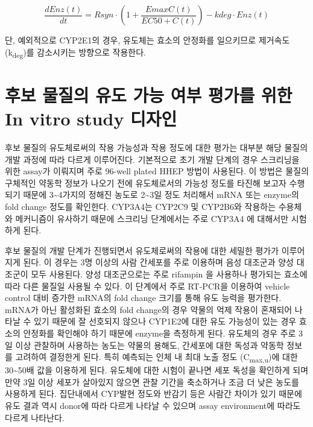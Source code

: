 \documentclass[
  11pt,
  krantz2, a4paper, twoside]{krantz}
\begin{document}
\begin{equation}
\frac{dEnz(t)}{dt} = R{syn} \cdot (1 + \frac{E{max}C(t)}{EC{50} + C(t)}) - k{deg} \cdot Enz(t)
\label{eq:eq10-2}
\end{equation}

단, 예외적으로 CYP2E1의 경우, 유도체는 효소의 안정화를 일으키므로 제거속도(k\textsubscript{deg})를 감소시키는 방향으로 작용한다.

\hypertarget{uxd6c4uxbcf4-uxbb3cuxc9c8uxc758-uxc720uxb3c4-uxac00uxb2a5-uxc5ecuxbd80-uxd3c9uxac00uxb97c-uxc704uxd55c-in-vitro-study-uxb514uxc790uxc778}{%
\section{후보 물질의 유도 가능 여부 평가를 위한 In vitro study 디자인}\label{uxd6c4uxbcf4-uxbb3cuxc9c8uxc758-uxc720uxb3c4-uxac00uxb2a5-uxc5ecuxbd80-uxd3c9uxac00uxb97c-uxc704uxd55c-in-vitro-study-uxb514uxc790uxc778}}

후보 물질의 유도체로써의 작용 가능성과 작용 정도에 대한 평가는 대부분 해당 물질의 개발 과정에 따라 다르게 이루어진다.
기본적으로 초기 개발 단계의 경우 스크리닝을 위한 assay가 이뤄지며 주로 96-well plated HHEP 방법이 사용된다. 이 방법은 물질의 구체적인 약동학 정보가 나오기 전에 유도체로서의 가능성 정도를 타진해 보고자 수행되기 때문에 3\textasciitilde4가지의 정해진 농도로 2\textasciitilde3일 정도 처리해서 mRNA 또는 enzyme의 fold change 정도를 확인한다. CYP3A4는 CYP2C9 및 CYP2B6와 작용하는 수용체와 메커니즘이 유사하기 때문에 스크리닝 단계에서는 주로 CYP3A4 에 대해서만 시험하게 된다.

후보 물질의 개발 단계가 진행되면서 유도체로써의 작용에 대한 세밀한 평가가 이루어지게 된다. 이 경우는 3명 이상의 사람 간세포를 주로 이용하며 음성 대조군과 양성 대조군이 모두 사용된다. 양성 대조군으로는 주로 rifampin 을 사용하나 평가되는 효소에 따라 다른 물질일 사용될 수 있다. 이 단계에서 주로 RT-PCR을 이용하여 vehicle control 대비 증가한 mRNA의 fold change 크기를 통해 유도 능력을 평가한다. mRNA가 아닌 활성화된 효소의 fold change의 경우 약물의 억제 작용이 혼재되어 나타날 수 있기 때문에 잘 선호되지 않으나 CYP1E2에 대한 유도 가능성이 있는 경우 효소의 안정화를 확인해야 하기 때문에 enzyme을 측정하게 된다.
유도체의 경우 주로 3일 이상 관찰하며 사용하는 농도는 약물의 용해도, 간세포에 대한 독성과 약동학 정보를 고려하여 결정한게 된다. 특히 예측되는 인체 내 최대 노출 정도 (C\textsubscript{max,u})에 대한 30\textasciitilde50배 값을 이용하게 된다. 유도체에 대한 시험이 끝나면 세포 독성을 확인하게 되며 만약 3일 이상 세포가 살아있지 않으면 관찰 기간을 축소하거나 조금 더 낮은 농도를 사용하게 된다.
집단내에서 CYP발현 정도와 반감기 등은 사람간 차이가 있기 때문에 유도 결과 역시 donor에 따라 다르게 나타날 수 있으며 assay environment에 따라도 다르게 나타난다.
\end{document}
